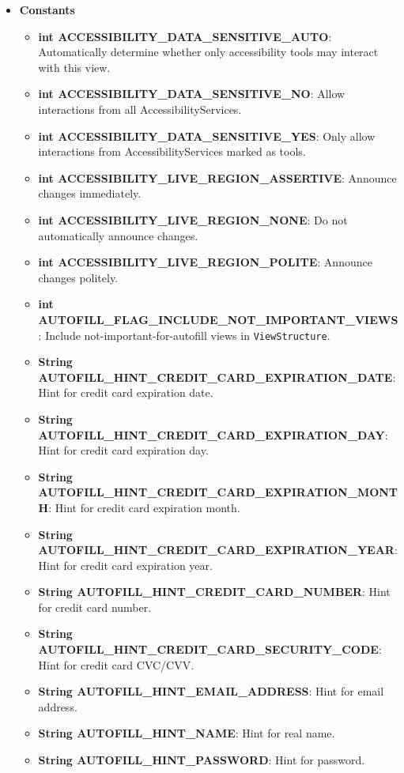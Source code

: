 \documentclass{report}
\begin{document}
\begin{itemize}
        \item \textbf{Constants}
            \begin{itemize}
                \item \textbf{int ACCESSIBILITY\_DATA\_SENSITIVE\_AUTO}: Automatically determine whether only accessibility tools may interact with this view.
                \item \textbf{int ACCESSIBILITY\_DATA\_SENSITIVE\_NO}: Allow interactions from all AccessibilityServices.
                \item \textbf{int ACCESSIBILITY\_DATA\_SENSITIVE\_YES}: Only allow interactions from AccessibilityServices marked as tools.
                \item \textbf{int ACCESSIBILITY\_LIVE\_REGION\_ASSERTIVE}: Announce changes immediately.
                \item \textbf{int ACCESSIBILITY\_LIVE\_REGION\_NONE}: Do not automatically announce changes.
                \item \textbf{int ACCESSIBILITY\_LIVE\_REGION\_POLITE}: Announce changes politely.
                \item \textbf{int AUTOFILL\_FLAG\_INCLUDE\_NOT\_IMPORTANT\_VIEWS}: Include not-important-for-autofill views in \texttt{ViewStructure}.
                \item \textbf{String AUTOFILL\_HINT\_CREDIT\_CARD\_EXPIRATION\_DATE}: Hint for credit card expiration date.
                \item \textbf{String AUTOFILL\_HINT\_CREDIT\_CARD\_EXPIRATION\_DAY}: Hint for credit card expiration day.
                \item \textbf{String AUTOFILL\_HINT\_CREDIT\_CARD\_EXPIRATION\_MONTH}: Hint for credit card expiration month.
                \item \textbf{String AUTOFILL\_HINT\_CREDIT\_CARD\_EXPIRATION\_YEAR}: Hint for credit card expiration year.
                \item \textbf{String AUTOFILL\_HINT\_CREDIT\_CARD\_NUMBER}: Hint for credit card number.
                \item \textbf{String AUTOFILL\_HINT\_CREDIT\_CARD\_SECURITY\_CODE}: Hint for credit card CVC/CVV.
                \item \textbf{String AUTOFILL\_HINT\_EMAIL\_ADDRESS}: Hint for email address.
                \item \textbf{String AUTOFILL\_HINT\_NAME}: Hint for real name.
                \item \textbf{String AUTOFILL\_HINT\_PASSWORD}: Hint for password.

\end{itemize}
\end{itemize}
\end{document}
